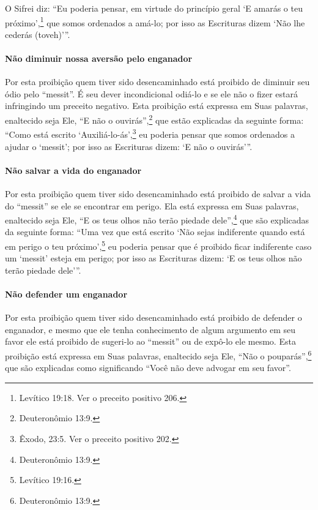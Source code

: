 O Sifrei diz: ``Eu poderia pensar, em virtude do princípio geral `E
amarás o teu próximo',\footnote{Levítico 19:18. Ver o preceito positivo 206.} que somos
ordenados a amá-lo; por isso as Escrituras dizem `Não lhe cederás
(toveh)'''.

\paragraph{Não diminuir nossa aversão pelo enganador}

Por esta proibição quem tiver sido desencaminhado está proibido de
diminuir seu ódio pelo ``messit''. É seu dever incondicional odiá-lo e
se ele não o fizer estará infringindo um preceito negativo. Esta
proibição está expressa em Suas palavras, enaltecido seja Ele, ``E não
o ouvirás'',\footnote{Deuteronômio 13:9.} que estão explicadas da seguinte forma:
``Como está escrito `Auxiliá-lo-ás',\footnote{Êxodo, 23:5. Ver o preceito positivo 202.} eu poderia pensar que somos ordenados a ajudar o `messit'; por isso as Escrituras dizem: `E não o ouvirás'''.

\paragraph{Não salvar a vida do enganador}

Por esta proibição quem tiver sido desencaminhado está proibido de
salvar a vida do ``messit'' se ele se encontrar em perigo. Ela está
expressa em Suas palavras, enaltecido seja Ele, ``E os teus olhos não
terão piedade dele'',\footnote{Deuteronômio 13:9.} que são explicadas da seguinte
forma: ``Uma vez que está escrito `Não sejas indiferente quando está em
perigo o teu próximo',\footnote{Levítico 19:16.} eu poderia pensar que é
proibido ficar indiferente caso um `messit' esteja em perigo; por isso
as Escrituras dizem: `E os teus olhos não terão piedade dele'''.

\paragraph{Não defender um enganador}

Por esta proibição quem tiver sido desencaminhado está proibido de
defender o enganador, e mesmo que ele tenha conhecimento de algum
argumento em seu favor ele está proibido de sugeri-lo ao ``messit'' ou
de expô-lo ele mesmo. Esta proibição está expressa em Suas palavras,
enaltecido seja Ele, ``Não o pouparás'',\footnote{Deuteronômio 13:9.} que são
explicadas como significando ``Você não deve advogar em seu favor''.

